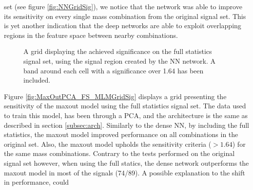 set (see figure \ref{fig:NNGridSig}), we notice that the network was able to improve its sensitivity on every single mass combination from the original signal set. This is yet another 
indication that the deep networks are able to exploit overlapping regions in the feature space between nearby combinations.\\
\begin{figure}
    \caption{A grid displaying the achieved significance on the full statistics signal set, using the signal region 
    created by the \acs{NN} network. A band around each cell with a significance over 1.64 has been included.}
    \label{fig:NN_FS_MLMGridSig}
\end{figure}
Figure \ref{fig:MaxOutPCA_FS_MLMGridSig} displays a grid presenting the sensitivity of the maxout model using the full statistics 
signal set. The data used to train this model, has been through a \ac{PCA}, and the architecture is the same as described in section \ref{subsec:arch}.
Similarly to the dense \ac{NN}, by including the full statistics, the maxout model improved performance on all combinations in the original set. 
Also, the maxout model upholds the sensitivity criteria ($>1.64$) for the same mass combinations. 
Contrary to the tests performed on the original signal set however, when using the full statics, the dense network 
outperforms the maxout model in most of the signals (74/89). A possible explanation to the shift in performance, could 
